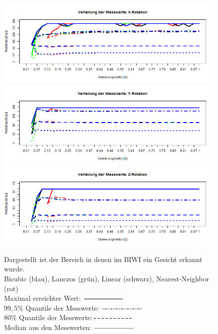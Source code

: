 \begin{figure}
	\centering
	\includegraphics[width=\linewidth]{img_Skalierung/Skal_Max_RX}
	\includegraphics[width=\linewidth]{img_Skalierung/Skal_Max_RY}
	\includegraphics[width=\linewidth]{img_Skalierung/Skal_Max_RZ}
	\caption{Dargestellt ist der Bereich in denen im BIWI \cite{database_Face_Ori} ein Gesicht erkannt wurde.\\
		Bicubic (blau), Lanczos (grün), Linear (schwarz), Nearest-Neighbor (rot)\\
		Maximal erreichter Wert: \protect\includegraphics[width=0.15\linewidth]{line/Line1}\\
		$99,5\%$ Quantile der Messwerte: \protect\includegraphics[width=0.15\linewidth]{line/Line4}\\
		$80\%$ Quantile der Messwerte:\protect\includegraphics[width=0.15\linewidth]{line/Line2}\\
		Median aus den Messwerten: \protect\includegraphics[width=0.15\linewidth]{line/Line3}}
	\label{img_Rot_Max}
\end{figure}
